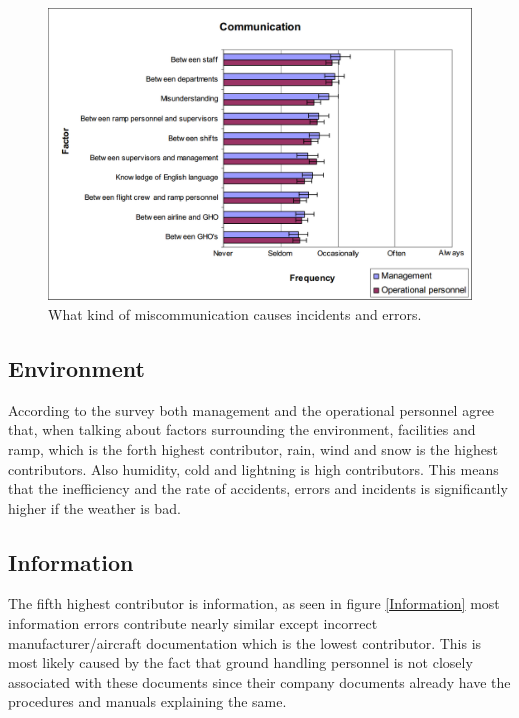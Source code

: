 \begin{figure}[H]
\centering
\includegraphics[width=\textwidth]{Grafik/CommunicationalFactors}
\caption{What kind of miscommunication causes incidents and errors.}
\label{CommunicationalFactors}
\end{figure}

\subsection{Environment}
According to the survey both management and the operational personnel agree that, when talking about factors surrounding the environment, facilities and ramp, which is the forth highest contributor, rain, wind and snow is the highest contributors. Also humidity, cold and lightning is high contributors. This means that the inefficiency and the rate of accidents, errors and incidents is significantly higher if the weather is bad.

\subsection{Information}
The fifth highest contributor is information, as seen in figure \ref{Information} most information errors contribute nearly similar except  incorrect manufacturer/aircraft documentation which is the lowest contributor. This is most likely caused by the fact that ground handling personnel is not closely associated with these documents since their company documents already have the procedures and manuals explaining the same.

